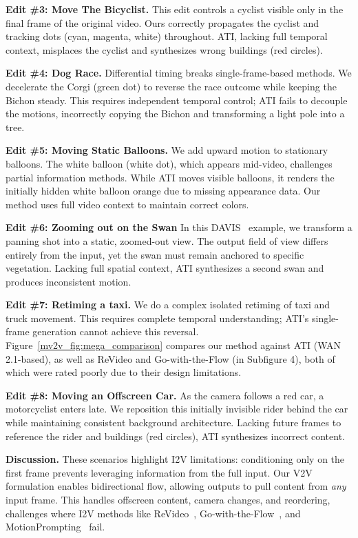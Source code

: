 \noindent\textbf{Edit \#3: Move The Bicyclist.} This edit controls a cyclist visible only in the final frame of the original video. Ours correctly propagates the cyclist and tracking dots (cyan, magenta, white) throughout. ATI, lacking full temporal context, misplaces the cyclist and synthesizes wrong buildings (red circles).

\noindent\textbf{Edit \#4: Dog Race.}
Differential timing breaks single-frame-based methods. We decelerate the Corgi (green dot) to reverse the race outcome while keeping the Bichon steady. This requires independent temporal control; ATI fails to decouple the motions, incorrectly copying the Bichon and transforming a light pole into a tree.

\noindent\textbf{Edit \#5: Moving Static Balloons.}
We add upward motion to stationary balloons. The white balloon (white dot), which appears mid-video, challenges partial information methods. While ATI moves visible balloons, it renders the initially hidden white balloon orange due to missing appearance data. Our method uses full video context to maintain correct colors.

\noindent\textbf{Edit \#6: Zooming out on the Swan}
In this DAVIS~\cite{davis2016} example, we transform a panning shot into a static, zoomed-out view. The output field of view differs entirely from the input, yet the swan must remain anchored to specific vegetation. Lacking full spatial context, ATI synthesizes a second swan and produces inconsistent motion.

\noindent\textbf{Edit \#7: Retiming a taxi.}
We do a complex isolated retiming of taxi and truck movement. This requires complete temporal understanding; ATI's single-frame generation cannot achieve this reversal. Figure~\ref{mv2v_fig:mega_comparison} compares our method against ATI (WAN 2.1-based), as well as ReVideo and Go-with-the-Flow (in Subfigure 4), both of which were rated poorly due to their design limitations.

\noindent \textbf{Edit \#8: Moving an Offscreen Car.}
As the camera follows a red car, a motorcyclist enters late. We reposition this initially invisible rider behind the car while maintaining consistent background architecture. Lacking future frames to reference the rider and buildings (red circles), ATI synthesizes incorrect content.


\noindent\textbf{Discussion.}
These scenarios highlight I2V limitations: conditioning only on the first frame prevents leveraging information from the full input. Our V2V formulation enables bidirectional flow, allowing outputs to pull content from \emph{any} input frame. This handles offscreen content, camera changes, and reordering, challenges where I2V methods like ReVideo~\cite{revideo2024}, Go-with-the-Flow~\cite{gowiththeflow2025}, and MotionPrompting~\cite{motionprompt2024} fail.
